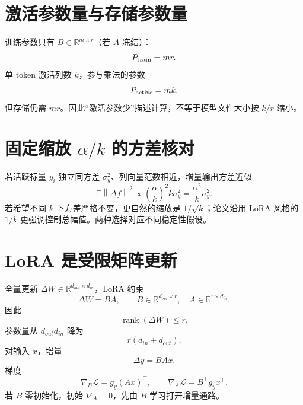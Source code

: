 \documentclass[UTF8,12pt,a4paper,fontset=none]{ctexart}
\numberwithin{equation}{section}
\newcommand{\R}{\mathbb{R}}
\newcommand{\E}{\mathbb{E}}
\newcommand{\Loss}{\mathcal{L}}
\newcommand{\norm}[1]{\left\lVert #1\right\rVert}
\newcommand{\rank}{\operatorname{rank}}
\begin{document}
\section{激活参数量与存储参数量}
训练参数只有 $B\in\R^{m\times r}$（若 $A$ 冻结）：
\begin{equation}
 P_{\rm train}=mr.
\end{equation}
单 token 激活列数 $k$，参与乘法的参数
\begin{equation}
 P_{\rm active}=mk.
\end{equation}
但存储仍需 $mr$。因此“激活参数少”描述计算，不等于模型文件大小按 $k/r$ 缩小。

\section{固定缩放 $\alpha/k$ 的方差核对}
若活跃标量 $y_i$ 独立同方差 $\sigma_y^2$、列向量范数相近，增量输出方差近似
\begin{equation}
 \E\norm{\Delta f}^2\propto
 \left(\frac{\alpha}{k}\right)^2k\sigma_y^2
 =\frac{\alpha^2}{k}\sigma_y^2.
\end{equation}
若希望不同 $k$ 下方差严格不变，更自然的缩放是 $1/\sqrt{k}$；论文沿用 LoRA 风格的 $1/k$ 更强调控制总幅值。两种选择对应不同稳定性假设。

\section{LoRA 是受限矩阵更新}
全量更新 $\Delta W\in\R^{d_{out}\times d_{in}}$，LoRA 约束
\begin{equation}
 \Delta W=BA,
 \qquad B\in\R^{d_{out}\times r},\quad A\in\R^{r\times d_{in}}.
\end{equation}
因此
\begin{equation}
 \rank(\Delta W)\le r.
\end{equation}
参数量从 $d_{out}d_{in}$ 降为
\begin{equation}
 r(d_{in}+d_{out}).
\end{equation}
对输入 $x$，增量
\begin{equation}
 \Delta y=BAx.
\end{equation}
梯度
\begin{equation}
 \nabla_B\Loss=g_y(Ax)^\top,
 \qquad
 \nabla_A\Loss=B^\top g_yx^\top.
\end{equation}
若 $B$ 零初始化，初始 $\nabla_A=0$，先由 $B$ 学习打开增量通路。
\end{document}
